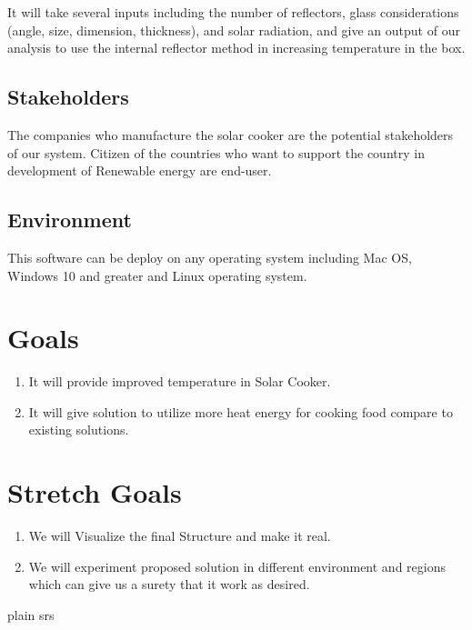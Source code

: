\documentclass{article}
\begin{document}
It will take several inputs including the number of reflectors, glass considerations (angle, size, dimension, thickness), and solar radiation, and give an output of our analysis to use the internal reflector method in increasing temperature in the box. 

\subsection{Stakeholders}

The companies who manufacture the solar cooker are the potential stakeholders of our system. Citizen of the countries who want to support the country in development of Renewable energy are end-user. 

\subsection{Environment}

This software can be deploy on any operating system including Mac OS, Windows 10 and greater and Linux operating system.   

\section{Goals}
\begin{enumerate}
    \item It will provide improved temperature in Solar Cooker. 
    \item It will give solution to utilize more heat energy for cooking food compare to existing solutions.   
\end{enumerate} 

\section{Stretch Goals}
\begin{enumerate}
    \item We will Visualize the final Structure and make it real. 
    \item We will experiment proposed solution in different environment and regions which can give us a surety that it work as desired. 
\end{enumerate} 

 {plain}
 {srs}
\end{document}
